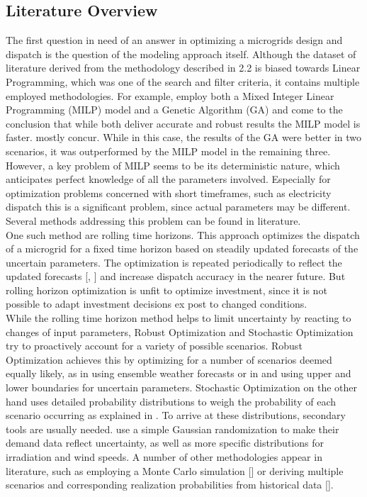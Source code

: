 \documentclass[
	11pt,								%
	DIV10,								%
	a4paper,         					%
	oneside,							%
	headheight=20pt,					%
	footheight=20pt,					%
    parskip=full,						%
    listof=totoc,						%
	bibliography=totoc,					%
	index=totoc,						%
]{scrartcl}
\begin{document}
\subsection{Literature Overview}
The first question in need of an answer in optimizing a microgrids design and dispatch is the question of the modeling approach itself. Although the dataset of literature derived from the methodology described in 2.2 is biased towards Linear Programming, which was one of the search and filter criteria, it contains multiple employed methodologies. For example, \cite{7975049} employ both a Mixed Integer Linear Programming (MILP) model and a Genetic Algorithm (GA) and come to the conclusion that while both deliver accurate and robust results the MILP model is faster. \cite{NEMATI2018944} mostly concur. While in this case, the results of the GA were better in two scenarios, it was outperformed by the MILP model in the remaining three.
However, a key problem of MILP seems to be its deterministic nature, which anticipates perfect knowledge of all the parameters involved. Especially for optimization problems concerned with short timeframes, such as electricity dispatch this is a significant problem, since actual parameters may be different. Several methods addressing this problem can be found in literature. 
\\
One such method are rolling time horizons. This approach optimizes the dispatch of a microgrid for a fixed time horizon based on steadily updated forecasts of the uncertain parameters. The optimization is repeated periodically to reflect the updated forecasts [\cite{palma2013microgrid}, \cite{silvente2015rolling}] and increase dispatch accuracy in the nearer future. But rolling horizon optimization is unfit to optimize investment, since it is not possible to adapt investment decisions ex post to changed conditions.
\\
While the rolling time horizon method helps to limit uncertainty by reacting to changes of input parameters, Robust Optimization and Stochastic Optimization try to proactively account for a variety of possible scenarios. Robust Optimization achieves this by optimizing for a number of scenarios deemed equally likely, as in \cite{CRAPARO2017135} using ensemble weather forecasts or in \cite{8240914} and \cite{zhang2015optimal} using upper and lower boundaries for uncertain parameters. Stochastic Optimization on the other hand uses detailed probability distributions to weigh the probability of each scenario occurring as explained in \cite{7540870}. To arrive at these distributions, secondary tools are usually needed. \cite{SHAMS2018326} use a simple Gaussian randomization to make their demand data reflect uncertainty, as well as more specific distributions for irradiation and wind speeds. A number of other methodologies appear in literature, such as employing a Monte Carlo simulation [\cite{ZHENG2018204}] or deriving multiple scenarios and corresponding realization probabilities from historical data [\cite{7244857}].
\end{document}
